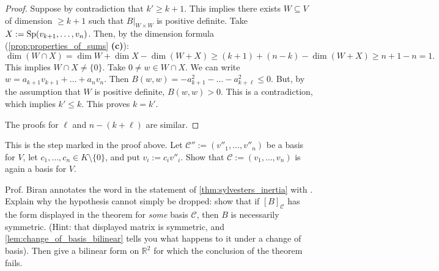 \begin{proof}
Suppose by contradiction that $k' \ge k+1$. This implies there exists $W \subseteq V$ of dimension $\ge k+1$ such that $B|_{W \times W}$ is positive definite. Take $X := \operatorname{Sp}(v_{k+1}, \dots, v_n)$.
Then, by the dimension formula (\cref{prop:properties_of_sums} \textbf{(c)}):
\[
\dim(W \cap X) = \dim W + \dim X - \dim(W+X) \ge (k+1) + (n-k) - \dim(W+X) \ge n+1 - n = 1.
\]
This implies $W \cap X \neq \{0\}$.
Take $0 \neq w \in W \cap X$. We can write $w = a_{k+1} v_{k+1} + \dots + a_n v_n$.
Then $B(w, w) = -a_{k+1}^2 - \dots - a_{k+\ell}^2 \le 0$. But, by the assumption that $W$ is positive definite, $B(w, w) > 0$. This is a contradiction, which implies $k' \le k$.
This proves $k = k'$.

The proofs for $\ell$ and $n - (k + \ell)$ are similar.
\end{proof}

\begin{exercise}
\label{exc:scaled_family_is_basis}
This is the step marked  in the proof above. Let $\mathcal{C}'' := (v''_1, \dots, v''_n)$ be a basis for $V$, let $c_1, \dots, c_n \in K \setminus \{0\}$, and put $v_i := c_i v''_i$. Show that $\mathcal{C} := (v_1, \dots, v_n)$ is again a basis for $V$.
\end{exercise}

\begin{exercise}
\label{exc:sylvester_needs_symmetry}
Prof. Biran annotates the word  in the statement of \cref{thm:sylvesters_inertia} with . Explain why the hypothesis cannot simply be dropped: show that if $[B]_{\mathcal{C}}$ has the form displayed in the theorem for \emph{some} basis $\mathcal{C}$, then $B$ is necessarily symmetric. (Hint: that displayed matrix is symmetric, and \cref{lem:change_of_basis_bilinear} tells you what happens to it under a change of basis). Then give a bilinear form on $\mathbb{R}^2$ for which the conclusion of the theorem fails.
\end{exercise}

